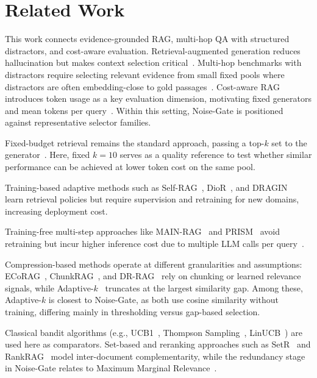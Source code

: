 \documentclass[runningheads]{llncs}
\begin{document}
\section{Related Work}
\label{sec:related}

This work connects evidence-grounded RAG, multi-hop QA with structured distractors, and cost-aware evaluation. Retrieval-augmented generation reduces hallucination but makes context selection critical~\cite{lewis2020rag}. Multi-hop benchmarks with distractors require selecting relevant evidence from small fixed pools where distractors are often embedding-close to gold passages~\cite{yang2018hotpotqa,chiang2024plausible,trivedi2023interleave}. Cost-aware RAG introduces token usage as a key evaluation dimension, motivating fixed generators and mean tokens per query~\cite{klesel2025rag,li2025bestpractices}. Within this setting, Noise-Gate is positioned against representative selector families.

Fixed-budget retrieval remains the standard approach, passing a top-$k$ set to the generator~\cite{lewis2020rag,klesel2025rag}. Here, fixed $k{=}10$ serves as a quality reference to test whether similar performance can be achieved at lower token cost on the same pool.

Training-based adaptive methods such as Self-RAG~\cite{asai2024selfrag}, DioR~\cite{guo2025dior}, and DRAGIN~\cite{su2024dragin} learn retrieval policies but require supervision and retraining for new domains, increasing deployment cost.

Training-free multi-step approaches like MAIN-RAG~\cite{chang2024mainrag} and PRISM~\cite{nahid2025prism} avoid retraining but incur higher inference cost due to multiple LLM calls per query~\cite{li2025bestpractices}.

Compression-based methods operate at different granularities and assumptions: ECoRAG~\cite{jeong2025ecorag}, ChunkRAG~\cite{singh2025chunkrag}, and DR-RAG~\cite{xiong2025drrag} rely on chunking or learned relevance signals, while Adaptive-$k$~\cite{taguchi2025adaptivek} truncates at the largest similarity gap. Among these, Adaptive-$k$ is closest to Noise-Gate, as both use cosine similarity without training, differing mainly in thresholding versus gap-based selection.

Classical bandit algorithms (e.g., UCB1~\cite{auer2002ucb1}, Thompson Sampling~\cite{thompson1933}, LinUCB~\cite{chu2011linucb}) are used here as comparators. Set-based and reranking approaches such as SetR~\cite{lee2025setr} and RankRAG~\cite{yu2024rankrag} model inter-document complementarity, while the redundancy stage in Noise-Gate relates to Maximum Marginal Relevance~\cite{goldstein1998mmr}.
\end{document}
